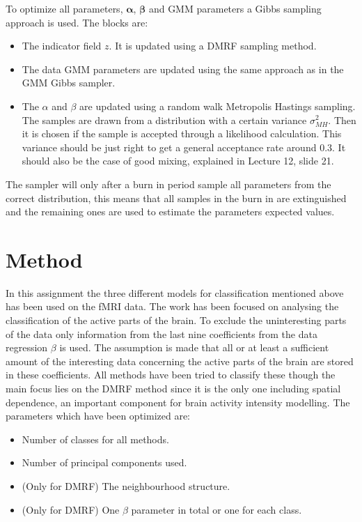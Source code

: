 \documentclass[a4paper,english]{article}
\begin{document}
To optimize all parameters, $\boldsymbol{\alpha}$, $\boldsymbol{\beta}$ and GMM parameters a Gibbs sampling approach is used.
The blocks are:
\begin{itemize}
  \item The indicator field $z$. It is updated using a DMRF sampling method.
  \item The data GMM parameters are updated using the same approach as in the GMM Gibbs sampler.
  \item The $\alpha$ and $\beta$ are updated using a random walk Metropolis Hastings sampling.
    The samples are drawn from a distribution with a certain variance $\sigma_{MH}^2$.
    Then it is chosen if the sample is accepted through a likelihood calculation.
    This variance should be just right to get a general acceptance rate around $0.3$.
    It should also be the case of good mixing, explained in Lecture 12, slide 21\cite{L12}.
\end{itemize}
The sampler will only after a burn in period sample all parameters from the correct distribution, this means that all samples in the burn in are extinguished and the remaining ones are used to estimate the parameters expected values.


\section{Method}
In this assignment the three different models for classification mentioned above has been used on the fMRI data.
The work has been focused on analysing the classification of the active parts of the brain.
To exclude the uninteresting parts of the data only information from the last nine coefficients from the data regression $\beta$ is used.
The assumption is made that all or at least a sufficient amount of the interesting data concerning the active parts of the brain are stored in these coefficients.
All methods have been tried to classify these though the main focus lies on the DMRF method since it is the only one including spatial dependence, an important component for brain activity intensity modelling.
The parameters which have been optimized are:
\begin{itemize}
  \item Number of classes for all methods.
  \item Number of principal components used.
  \item (Only for DMRF) The neighbourhood structure.
  \item (Only for DMRF) One $\beta$ parameter in total or one for each class.
\end{itemize}
\end{document}
